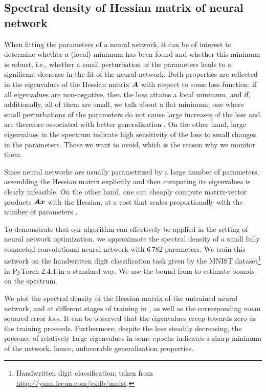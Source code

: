 \subsection{Spectral density of Hessian matrix of neural network}
\label{subsec:hessian}

When fitting the parameters of a neural network, it can be of interest to determine whether a (local) minimum has been found and whether this minimum is robust, i.e., whether a small perturbation of the parameters leads to a significant decrease in the fit of the neural network. Both properties are reflected in the eigenvalues of the Hessian matrix $\boldsymbol{A}$ with respect to some loss function: if all eigenvalues are non-negative, then the loss attains a local minimum, and if, additionally, all of them are small, we talk about a flat minimum; one where small perturbations of the parameters do not cause large increases of the loss and are therefore associated with better generalization \cite{yao-2020-pyhessian-neural}. On the other hand, large eigenvalues in the spectrum indicate high sensitivity of the loss to small changes in the parameters. Those we want to avoid, which is the reason why we monitor them.

Since neural networks are usually parametrized by a large number of parameters, assembling the Hessian matrix explicitly and then computing its eigenvalues is clearly infeasible. On the other hand, one can cheaply compute matrix-vector products $\boldsymbol{A} \boldsymbol{x}$ with the Hessian, at a cost that scales proportionally with the number of parameters \cite{pearlmutter-1994-fast-exact}.

To demonstrate that our algorithm can effectively be applied in the setting of neural network optimization, we approximate the spectral density of a small fully connected convolutional neural network with $6\,782$ parameters. We train this network on the handwritten digit classification task given by the MNIST dataset\footnote{Handwritten digit classification; taken from \url{http://yann.lecun.com/exdb/mnist}.} in PyTorch 2.4.1 in a standard way. We use the bound from \cite[Theorem 1]{zhou-2011-bounding-spectrum} to estimate bounds on the spectrum.

We plot the spectral density of the Hessian matrix of the untrained neural network, and at different stages of training in , as well as the corresponding mean squared error loss. It can be observed that the eigenvalues creep towards zero as the training proceeds. Furthermore, despite the loss steadily decreasing, the presence of relatively large eigenvalues in some epochs indicates a sharp minimum of the network, hence, unfavorable generalization properties.

